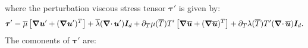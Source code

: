 \documentclass{article}
\begin{document}
where the perturbation viscous stress tensor $\bm{\tau}'$ is given by:
\begin{equation*}
	\bm{\tau}' = \overline{\mu} \left[ \grad \bm{u}' + (\grad \bm{u}')^T\right] + \overline\lambda (\operatorname{\boldsymbol{\mathrm{\nabla}}\cdot} \bm{u}') \bm{I}_d + \partial_T \mu (\overline{T}) T' \left[ \grad \overline{\bm{u}} + (\grad \overline{\bm{u}})^T\right] + \partial_T \lambda (\overline{T}) T' (\operatorname{\boldsymbol{\mathrm{\nabla}}\cdot} \overline{\bm{u}}) \bm{I}_d.
\end{equation*}
The comonents of $\bm{\tau}'$ are:
\end{document}
